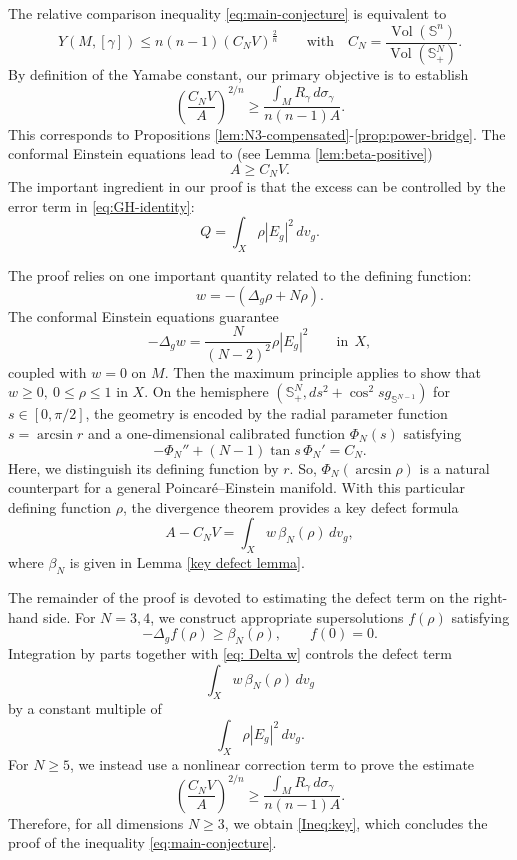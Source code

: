 \documentclass[11pt,letterpaper]{amsart}
\theoremstyle{definition}
\theoremstyle{remark}
\numberwithin{equation}{section}
\newcommand{\Sph}{\mathbb S}
\newcommand{\vol}{\operatorname{Vol}}
\begin{document}
The relative comparison inequality  \eqref{eq:main-conjecture} is equivalent to
\begin{equation}\label{eq:Ineq equi}
Y(M,[\gamma]) \leq n(n-1) \left(C_NV\right)^{\frac{2}{n}} \qquad \mathrm{with}\quad C_N=\frac{\vol(\Sph^n)}{\vol(\Sph^{N}_+)}.
\end{equation}
By definition of the Yamabe constant, our primary objective is to establish
\begin{equation}\label{Ineq:key}
\left(\frac{C_NV}{A}\right)^{2/n}
 \ge
 \frac{\int_MR_\gamma\,d\sigma_\gamma}{n(n-1)A}.
 \end{equation}
This corresponds to Propositions \ref{lem:N3-compensated}-\ref{prop:power-bridge}.
The conformal Einstein equations lead to (see Lemma \ref{lem:beta-positive})
\[
  A\ge C_N V.
\]
The important ingredient in our proof is that the excess can be controlled
by the error term in \eqref{eq:GH-identity}:
\[
  Q=\int_X \rho |E_g|^2\,dv_g.
\]

The proof relies on one important quantity related to the defining function:
\[
  w=-(\Delta_g\rho+N\rho).
\]
The conformal Einstein equations guarantee
\begin{equation}\label{eq: Delta w}
-\Delta_g w=\frac{N}{(N-2)^2}\rho |E_g|^2 \qquad \mathrm{in~~} X,
\end{equation}
coupled with $w=0$ on $M$. Then the maximum principle applies to show that $w\ge 0, ~0 \leq \rho \leq 1$ in $X$.
On the hemisphere $(\Sph_+^N,d s^2+\cos ^2 s g_{\mathbb{S}^{N-1}})$ for $s\in [0, \pi/2]$, the geometry is encoded by the radial parameter function $s=\arcsin r$ and a one-dimensional calibrated function $\Phi_N(s)$ satisfying
\[
 -\Phi_N''+(N-1)\tan s\,\Phi_N'=C_N.
\]
Here, we distinguish its defining function by $r$.
So, $\Phi_N(\arcsin \rho)$ is a natural counterpart for  a general Poincar\'e--Einstein manifold. With this particular defining function $\rho$, the divergence theorem provides a key defect formula
\begin{equation}\label{defect-formula}
  A-C_NV=\int_X w\,\beta_N(\rho)\,dv_g,
\end{equation}
where $\beta_N$ is given in  Lemma \ref{key defect lemma}.

The remainder of the proof is devoted to estimating the defect term on the
right-hand side. For \(N=3,4\), we construct appropriate  supersolutions
\(f(\rho)\) satisfying
$$
  -\Delta_g f(\rho)\ge \beta_N(\rho),
  \qquad
  f(0)=0.
$$
Integration by parts together with \eqref{eq: Delta w} controls the
defect term
$$
  \int_X w\,\beta_N(\rho)\,dv_g
$$
by a constant multiple of
$$
  \int_X \rho |E_g|^2\,dv_g.
$$
For \(N\ge 5\), we instead use a nonlinear correction term to prove the
 estimate
$$
  \left(\frac{C_N V}{A}\right)^{2/n}
  \ge
  \frac{\int_M R_\gamma\,d\sigma_\gamma}{n(n-1)A}.
$$
Therefore, for all dimensions $N \geq 3$, we obtain \eqref{Ineq:key}, which concludes the proof of the inequality \eqref{eq:main-conjecture}.
\end{document}
